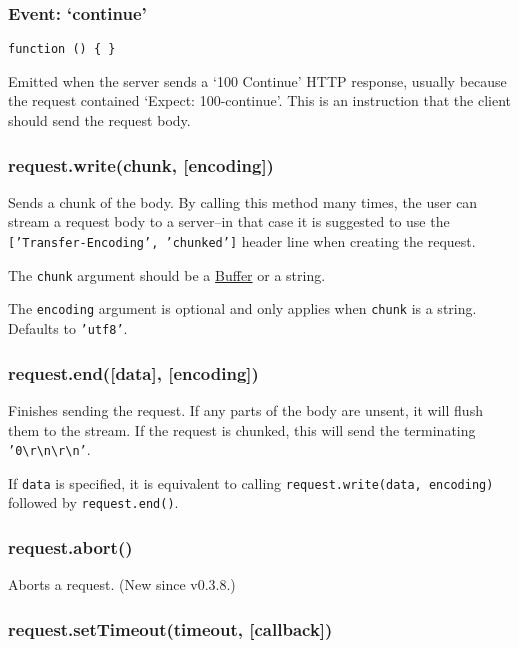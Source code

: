 \subsubsection{Event: `continue'}

\texttt{function () \{ \}}

Emitted when the server sends a `100 Continue' HTTP response, usually
because the request contained `Expect: 100-continue'. This is an
instruction that the client should send the request body.

\subsubsection{request.write(chunk, {[}encoding{]})}

Sends a chunk of the body. By calling this method many times, the user
can stream a request body to a server--in that case it is suggested to
use the \texttt{{[}'Transfer-Encoding', 'chunked'{]}} header line when
creating the request.

The \texttt{chunk} argument should be a
\href{buffer.html\#buffer\_buffer}{Buffer} or a string.

The \texttt{encoding} argument is optional and only applies when
\texttt{chunk} is a string. Defaults to \texttt{'utf8'}.

\subsubsection{request.end({[}data{]}, {[}encoding{]})}

Finishes sending the request. If any parts of the body are unsent, it
will flush them to the stream. If the request is chunked, this will send
the terminating
\texttt{'0\textbackslash{}r\textbackslash{}n\textbackslash{}r\textbackslash{}n'}.

If \texttt{data} is specified, it is equivalent to calling
\texttt{request.write(data, encoding)} followed by
\texttt{request.end()}.

\subsubsection{request.abort()}

Aborts a request. (New since v0.3.8.)

\subsubsection{request.setTimeout(timeout, {[}callback{]})}


